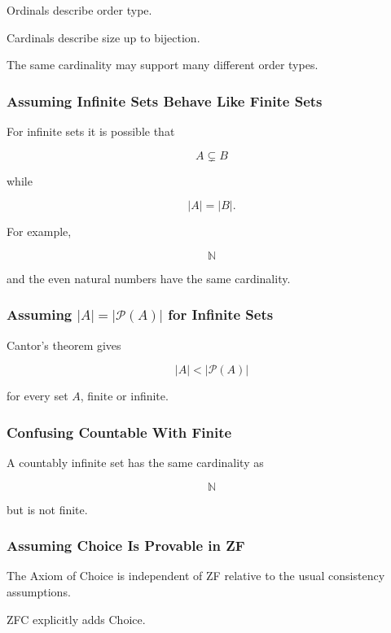 Ordinals describe order type.

Cardinals describe size up to bijection.

The same cardinality may support many different order types.

\subsubsection{Assuming Infinite Sets Behave Like Finite Sets}

For infinite sets it is possible that

\[
A
\subsetneq
B
\]

while

\[
|A|=|B|.
\]

For example,

\[
\mathbb{N}
\]

and the even natural numbers have the same cardinality.

\subsubsection{Assuming \(|A|=|\mathcal{P}(A)|\) for Infinite Sets}

Cantor's theorem gives

\[
\boxed{
|A|
<
|\mathcal{P}(A)|
}
\]

for every set \(A\), finite or infinite.

\subsubsection{Confusing Countable With Finite}

A countably infinite set has the same cardinality as

\[
\mathbb{N}
\]

but is not finite.

\subsubsection{Assuming Choice Is Provable in ZF}

The Axiom of Choice is independent of ZF relative to the usual consistency
assumptions.

ZFC explicitly adds Choice.


